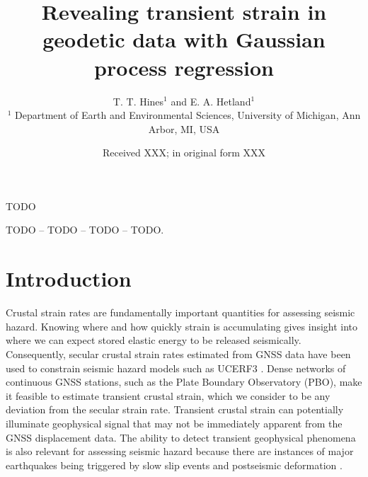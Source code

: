 \documentclass{gji}
\title[Transient strain in geodetic data]
  {Revealing transient strain in geodetic data with Gaussian process regression}
\author{T. T. Hines$^1$ and E. A. Hetland$^1$ \\
        $^1$ Department of Earth and Environmental Sciences, University of Michigan, Ann Arbor, MI, USA}
\date{Received XXX; in original form XXX}
\begin{document}
\label{firstpage}

\maketitle

\begin{summary}
TODO
\end{summary}

\begin{keywords}
 TODO -- TODO -- TODO -- TODO.
\end{keywords}

\section{Introduction}\label{sec:Introduction}
Crustal strain rates are fundamentally important quantities for assessing seismic hazard. Knowing where and how quickly strain is accumulating gives insight into where we can expect stored elastic energy to be released seismically. Consequently, secular crustal strain rates estimated from GNSS data have been used to constrain seismic hazard models such as UCERF3 \citep{Field2014}. Dense networks of continuous GNSS stations, such as the Plate Boundary Observatory (PBO), make it feasible to estimate transient crustal strain, which we consider to be any deviation from the secular strain rate.  Transient crustal strain can potentially illuminate geophysical signal that may not be immediately apparent from the GNSS displacement data. The ability to detect transient geophysical phenomena is also relevant for assessing seismic hazard because there are instances of major earthquakes being triggered by slow slip events \citep{Roeloffs2006} and postseismic deformation \citep{Freed2001}. 
\end{document}
